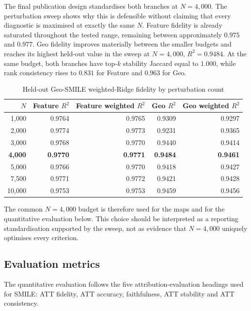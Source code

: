 The final publication design standardises both branches at $N=4{,}000$. The perturbation sweep shows why this is defensible without claiming that every diagnostic is maximised at exactly the same $N$. Feature fidelity is already saturated throughout the tested range, remaining between approximately $0.975$ and $0.977$. Geo fidelity improves materially between the smaller budgets and reaches its highest held-out value in the sweep at $N=4{,}000$, $R^2=0.9484$. At the same budget, both branches have top-$k$ stability Jaccard equal to $1.000$, while rank consistency rises to $0.831$ for Feature and $0.963$ for Geo.

\begin{table}[H]
\centering
\caption{Held-out Geo-SMILE weighted-Ridge fidelity by perturbation count}
\label{tab:hull_fidelity_by_n}
\small
\begin{tabular}{rrrrr}
\toprule
$N$ & Feature $R^2$ & Feature weighted $R^2$ & Geo $R^2$ & Geo weighted $R^2$ \\
\midrule
1,000 & 0.9764 & 0.9765 & 0.9309 & 0.9297 \\
2,000 & 0.9774 & 0.9773 & 0.9231 & 0.9365 \\
3,000 & 0.9768 & 0.9770 & 0.9440 & 0.9414 \\
\textbf{4,000} & \textbf{0.9770} & \textbf{0.9771} & \textbf{0.9484} & \textbf{0.9461} \\
5,000 & 0.9766 & 0.9770 & 0.9418 & 0.9427 \\
7,500 & 0.9771 & 0.9772 & 0.9421 & 0.9428 \\
10,000 & 0.9753 & 0.9753 & 0.9459 & 0.9456 \\
\bottomrule
\end{tabular}
\end{table}



The common $N=4{,}000$ budget is therefore used for the maps and for the quantitative evaluation below. This choice should be interpreted as a reporting standardisation supported by the sweep, not as evidence that $N=4{,}000$ uniquely optimises every criterion.

\subsection{Evaluation metrics}
\label{sec:hull_quant_results}

The quantitative evaluation follows the five attribution-evaluation headings used for SMILE: ATT fidelity, ATT accuracy, faithfulness, ATT stability and ATT consistency.

